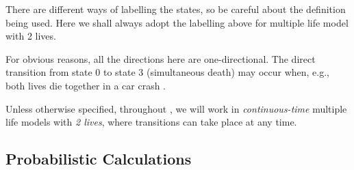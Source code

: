 \begin{enumerate}
\begin{warning}
There are different ways of labelling the states, so be careful about the
definition being used. Here we shall always adopt the labelling above for
multiple life model with 2 lives.
\end{warning}

For obvious reasons, all the directions here are one-directional. The
direct transition from state 0 to state 3 (simultaneous death) may occur when,
e.g., both lives die together in a car crash .

Unless otherwise specified, throughout , we will
work in \emph{continuous-time} multiple life models with \emph{2 lives}, where
transitions can take place at any time.
\end{enumerate}
\subsection{Probabilistic Calculations}
\label{subsect:mult-life-prob-calc}
